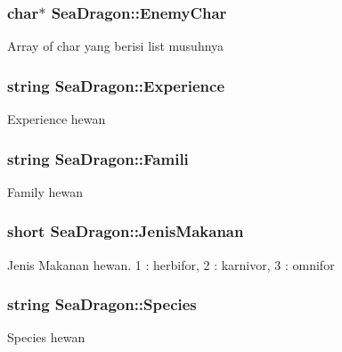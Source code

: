 \subsubsection[{\texorpdfstring{Enemy\+Char}{EnemyChar}}]{\setlength{\rightskip}{0pt plus 5cm}char$\ast$ Sea\+Dragon\+::\+Enemy\+Char\hspace{0.3cm}{\ttfamily [protected]}}\hypertarget{class_sea_dragon_a0f81865d76a2f786aa0d095caf2c1607}{}\label{class_sea_dragon_a0f81865d76a2f786aa0d095caf2c1607}
Array of char yang berisi list musuhnya 
\subsubsection[{\texorpdfstring{Experience}{Experience}}]{\setlength{\rightskip}{0pt plus 5cm}string Sea\+Dragon\+::\+Experience\hspace{0.3cm}{\ttfamily [protected]}}\hypertarget{class_sea_dragon_a6e46d2d7a8807dfd4020a71699cae2ae}{}\label{class_sea_dragon_a6e46d2d7a8807dfd4020a71699cae2ae}
Experience hewan 
\subsubsection[{\texorpdfstring{Famili}{Famili}}]{\setlength{\rightskip}{0pt plus 5cm}string Sea\+Dragon\+::\+Famili\hspace{0.3cm}{\ttfamily [protected]}}\hypertarget{class_sea_dragon_a40ff623ba2816d34c630569da6c13bcd}{}\label{class_sea_dragon_a40ff623ba2816d34c630569da6c13bcd}
Family hewan 
\subsubsection[{\texorpdfstring{Jenis\+Makanan}{JenisMakanan}}]{\setlength{\rightskip}{0pt plus 5cm}short Sea\+Dragon\+::\+Jenis\+Makanan\hspace{0.3cm}{\ttfamily [protected]}}\hypertarget{class_sea_dragon_ac834a54d7353af6282c1842b8ea411e7}{}\label{class_sea_dragon_ac834a54d7353af6282c1842b8ea411e7}
Jenis Makanan hewan. 1 \+: herbifor, 2 \+: karnivor, 3 \+: omnifor 
\subsubsection[{\texorpdfstring{Species}{Species}}]{\setlength{\rightskip}{0pt plus 5cm}string Sea\+Dragon\+::\+Species\hspace{0.3cm}{\ttfamily [protected]}}\hypertarget{class_sea_dragon_a7f5f1a4022a09dbfed539a25ed2aba17}{}\label{class_sea_dragon_a7f5f1a4022a09dbfed539a25ed2aba17}
Species hewan 
